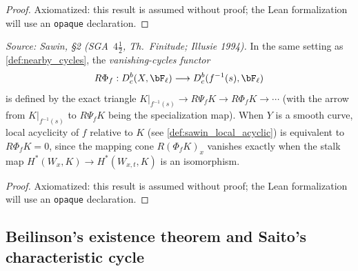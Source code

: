 \begin{proof}
  Axiomatized: this result is assumed without proof; the Lean formalization will use
  an \texttt{opaque} declaration.
\end{proof}

\begin{definition}
  \label{def:vanishing_cycles}
  \textit{Source: Sawin, §2 (SGA~$4\tfrac{1}{2}$, Th.\ Finitude; Illusie 1994).}
  In the same setting as \cref{def:nearby_cycles}, the \emph{vanishing-cycles
  functor}
  \[ R\Phi_f : D^b_c(X,\bF_\ell) \longrightarrow D^b_c(f^{-1}(s),\bF_\ell) \]
  is defined by the exact triangle $K|_{f^{-1}(s)} \to R\Psi_f K \to R\Phi_f K \to
  \cdots$ (with the arrow from $K|_{f^{-1}(s)}$ to $R\Psi_f K$ being the
  specialization map).  When $Y$ is a smooth curve, local acyclicity of $f$ relative
  to $K$ (see \cref{def:sawin_local_acyclic}) is equivalent to $R\Phi_f K = 0$, since
  the mapping cone $R(\Phi_f K)_x$ vanishes exactly when the stalk map
  $H^*(W_x,K)\to H^*(W_{x,t},K)$ is an isomorphism.
\end{definition}

\begin{proof}
  Axiomatized: this result is assumed without proof; the Lean formalization will use
  an \texttt{opaque} declaration.
\end{proof}

\subsection{Beilinson's existence theorem and Saito's characteristic cycle}

